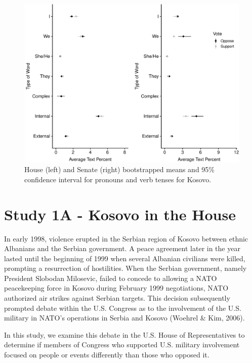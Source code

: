 \documentclass[english,,man,floatsintext]{apa6}
\begin{document}
\begin{figure}
\centering
\includegraphics{Language_of_War_Markdown_KJ2_files/figure-latex/Kpic-1.pdf}
\caption{\label{fig:Kpic}House (left) and Senate (right) bootstrapped means and 95\% confidence interval for pronouns and verb tenses for Kosovo.}
\end{figure}

\hypertarget{study-1a---kosovo-in-the-house}{%
\section{Study 1A - Kosovo in the House}\label{study-1a---kosovo-in-the-house}}

In early 1998, violence erupted in the Serbian region of Kosovo between ethnic Albanians and the Serbian government. A peace agreement later in the year lasted until the beginning of 1999 when several Albanian civilians were killed, prompting a resurrection of hostilities. When the Serbian government, namely President Slobodan Milosevic, failed to concede to allowing a NATO peacekeeping force in Kosovo during February 1999 negotiations, NATO authorized air strikes against Serbian targets. This decision subsequently prompted debate within the U.S. Congress as to the involvement of the U.S. military in NATO's operations in Serbia and Kosovo (Woehrel \& Kim, 2006).

In this study, we examine this debate in the U.S. House of Representatives to determine if members of Congress who supported U.S. military involvement focused on people or events differently than those who opposed it.
\end{document}

